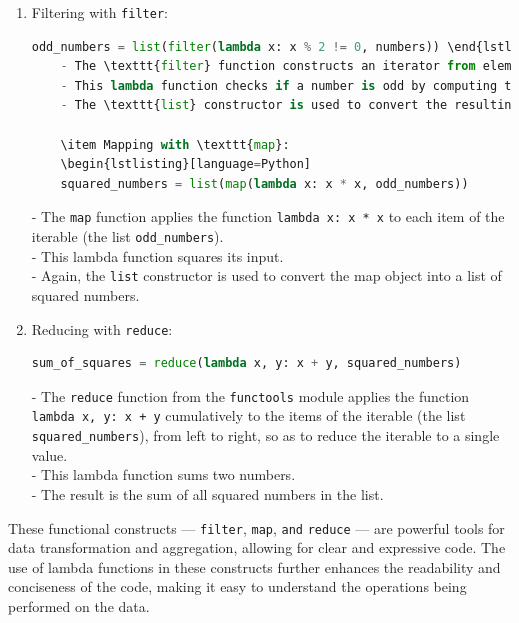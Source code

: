 \documentclass[a4paper]{article}
\begin{document}
\begin{enumerate}
    \item Filtering with \texttt{filter}:
    \begin{lstlisting}[language=Python]
    odd_numbers = list(filter(lambda x: x % 2 != 0, numbers)) \end{lstlisting}
    - The \texttt{filter} function constructs an iterator from elements of the iterable (in this case, the list \texttt{numbers}) for which the function \texttt{lambda x: x \% 2 != 0} returns \texttt{True}.\\
    - This lambda function checks if a number is odd by computing the remainder of the division by 2.\\
    - The \texttt{list} constructor is used to convert the resulting iterator back into a list, containing only the odd numbers.\\

    \item Mapping with \texttt{map}:
    \begin{lstlisting}[language=Python]
    squared_numbers = list(map(lambda x: x * x, odd_numbers)) \end{lstlisting}
    - The \texttt{map} function applies the function \texttt{lambda x: x * x} to each item of the iterable (the list \texttt{odd\_numbers}).\\
    - This lambda function squares its input.\\
    - Again, the \texttt{list} constructor is used to convert the map object into a list of squared numbers.\\

    \item Reducing with \texttt{reduce}:
    \begin{lstlisting}[language=Python]
    sum_of_squares = reduce(lambda x, y: x + y, squared_numbers) \end{lstlisting}
    - The \texttt{reduce} function from the \texttt{functools} module applies the function \texttt{lambda x, y: x + y} cumulatively to the items of the iterable (the list \texttt{squared\_numbers}), from left to right, so as to reduce the iterable to a single value.\\
    - This lambda function sums two numbers.\\
    - The result is the sum of all squared numbers in the list.\\
\end{enumerate}


These functional constructs — \texttt{filter}, \texttt{map}, \texttt{and} \texttt{reduce} — are powerful tools for data transformation and aggregation, allowing for clear and expressive code. The use of lambda functions in these constructs further enhances the readability and conciseness of the code, making it easy to understand the operations being performed on the data.
\end{document}
